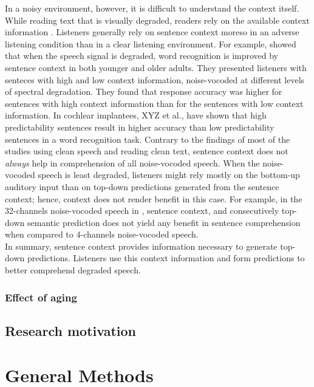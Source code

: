 \documentclass[a4paper, nobind]{templates/ociamthesis}
\begin{document}
In a noisy environment, however, it is difficult to understand the context itself.
While reading text that is visually degraded, readers rely on the available context information \autocite[e.g.,][]{Clark2021}.
Listeners generally rely on sentence context moreso in an adverse listening condition than in a clear listening environment.
For example, \textcite{Sheldon2008a} showed that when the speech signal is degraded, word recognition is improved by sentence context in both younger and older adults.
They presented listeners with senteces with high and low context information, noise-vocoded at different levels of spectral degradation.
They found that response accuracy was higher for sentences with high context information than for the sentences with low context information.
In cochlear implantees, XYZ et al., have shown that high predictability sentences result in higher accuracy than low predictability sentences in a word recognition task.
Contrary to the findings of most of the studies using clean speech and reading clean text, sentence context does not \emph{always} help in comprehension of all noise-vocoded speech.
When the noise-vocoded speech is least degraded, listeners might rely mostly on the bottom-up auditory input than on top-down predictions generated from the sentence context; hence, context does not render benefit in this case.
For example, in the 32-channels noise-vocoded speech in \textcite{Obleser2010}, sentence context, and consecutively top-down semantic prediction does not yield any benefit in sentence comprehension when compared to 4-channels noise-vocoded speech.\\

In summary, sentence context provides information necessary to generate top-down predictions.
Listeners use this context information and form predictions to better comprehend degraded speech.

\hypertarget{effect-of-aging}{%
\subsection{Effect of aging}\label{effect-of-aging}}

\hypertarget{research-motivation}{%
\section{Research motivation}\label{research-motivation}}

\hypertarget{general-methods}{%
\chapter{General Methods}\label{general-methods}}
\end{document}
